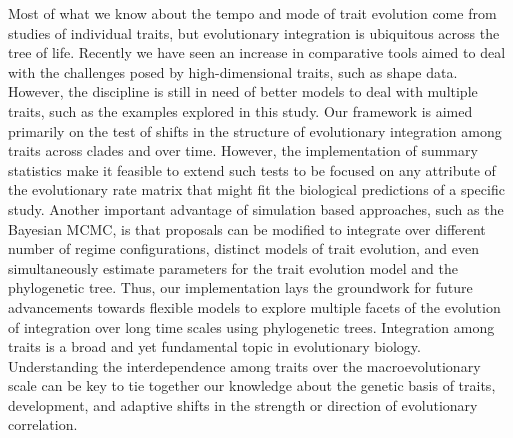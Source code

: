 Most of what we know about the tempo and mode of trait evolution come from studies of individual traits, but evolutionary integration is ubiquitous across the tree of life. Recently we have seen an increase in comparative tools aimed to deal with the challenges posed by high-dimensional traits, such as shape data. However, the discipline is still in need of better models to deal with multiple traits, such as the examples explored in this study. Our framework is aimed primarily on the test of shifts in the structure of evolutionary integration among traits across clades and over time. However, the implementation of summary statistics make it feasible to extend such tests to be focused on any attribute of the evolutionary rate matrix that might fit the biological predictions of a specific study. Another important advantage of simulation based approaches, such as the Bayesian MCMC, is that proposals can be modified to integrate over different number of regime configurations, distinct models of trait evolution, and even simultaneously estimate parameters for the trait evolution model and the phylogenetic tree. Thus, our implementation lays the groundwork for future advancements towards flexible models to explore multiple facets of the evolution of integration over long time scales using phylogenetic trees. Integration among traits is a broad and yet fundamental topic in evolutionary biology. Understanding the interdependence among traits over the macroevolutionary scale can be key to tie together our knowledge about the genetic basis of traits, development, and adaptive shifts in the strength or direction of evolutionary correlation.

\newpage

